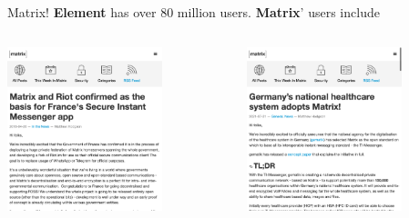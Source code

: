 \documentclass[aspectratio=169]{beamer}
\begin{document}
\begin{frame}{Matrix!}
  \textbf{Element} has over 80 million users. \textbf{Matrix}' users include

  \begin{columns}
    \begin{column}{0.3\columnwidth}
      \begin{center}
        \includegraphics[width=4.5cm]{matrix-french-government.png}
      \end{center}
    \end{column}
    \begin{column}{0.3\columnwidth}
      \begin{center}
        \includegraphics[width=4.5cm]{matrix-german-healthcare.png}
      \end{center}
    \end{column}
  \end{columns}

\end{frame}
\end{document}
